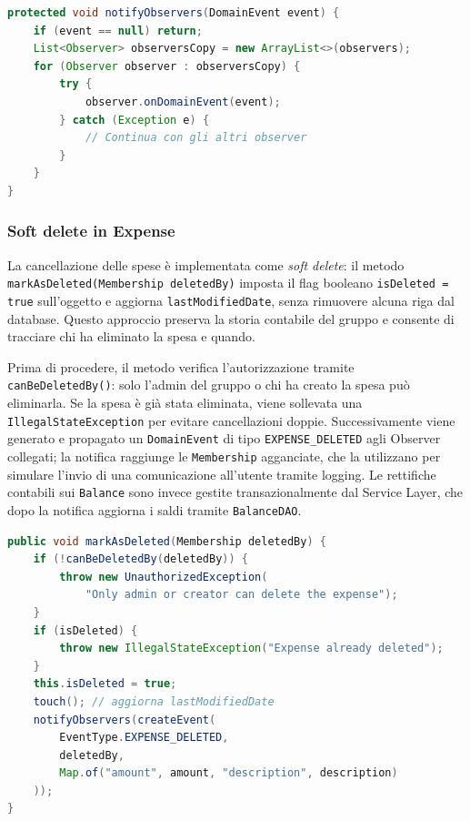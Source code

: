 \begin{lstlisting}[language=Java, caption={Notifica sicura degli observer in Subject}]
protected void notifyObservers(DomainEvent event) {
    if (event == null) return;
    List<Observer> observersCopy = new ArrayList<>(observers);
    for (Observer observer : observersCopy) {
        try {
            observer.onDomainEvent(event);
        } catch (Exception e) {
            // Continua con gli altri observer
        }
    }
}
\end{lstlisting}

\subsubsection{Soft delete in Expense}

La cancellazione delle spese è implementata come \textit{soft delete}: il metodo
\texttt{markAsDeleted(Membership deletedBy)} imposta il flag booleano
\texttt{isDeleted = true} sull'oggetto e aggiorna \texttt{lastModifiedDate}, senza
rimuovere alcuna riga dal database. Questo approccio preserva la storia contabile
del gruppo e consente di tracciare chi ha eliminato la spesa e quando.

Prima di procedere, il metodo verifica l'autorizzazione tramite
\texttt{canBeDeletedBy()}: solo l'admin del gruppo o chi ha creato la spesa può
eliminarla. Se la spesa è già stata eliminata, viene sollevata una
\texttt{IllegalStateException} per evitare cancellazioni doppie. Successivamente
viene generato e propagato un \texttt{DomainEvent} di tipo
\texttt{EXPENSE\_DELETED} agli Observer collegati; la notifica raggiunge le
\texttt{Membership} agganciate, che la utilizzano per simulare l'invio di una
comunicazione all'utente tramite logging. Le rettifiche contabili sui
\texttt{Balance} sono invece gestite transazionalmente dal Service Layer, che
dopo la notifica aggiorna i saldi tramite \texttt{BalanceDAO}.

\begin{lstlisting}[language=Java, caption={Soft delete in Expense}]
public void markAsDeleted(Membership deletedBy) {
    if (!canBeDeletedBy(deletedBy)) {
        throw new UnauthorizedException(
            "Only admin or creator can delete the expense");
    }
    if (isDeleted) {
        throw new IllegalStateException("Expense already deleted");
    }
    this.isDeleted = true;
    touch(); // aggiorna lastModifiedDate
    notifyObservers(createEvent(
        EventType.EXPENSE_DELETED,
        deletedBy,
        Map.of("amount", amount, "description", description)
    ));
}
\end{lstlisting}


